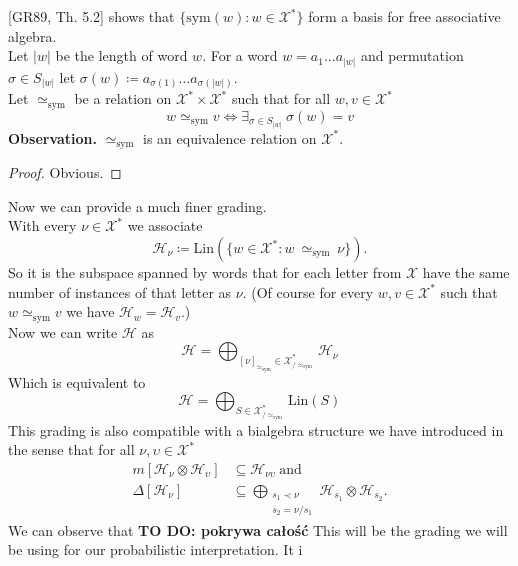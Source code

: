 \documentclass[a4paper, 12pt]{article}
\newcommand{\todo}[1]{\hfill \break \textbf{\Huge TO DO: #1 \hfill \break}\normalsize}
\newcommand{\SimeqSym}{{\simeq_\mathrm{sym}}}
\begin{document}
[GR89, Th. 5.2] shows that $\{\mathrm{sym}(w) : w \in \mathcal{X^*}\}$ form a basis for free associative
algebra. \\
Let $|w|$ be the length of word $w$. For a word $w = a_1\dots a_{|w|}$ and permutation
$\sigma \in S_{|w|}$ let $\sigma(w) \coloneqq a_{\sigma(1)}\dots a_{\sigma(|w|)}$. \\
Let $\simeq_\mathrm{sym}$ be
a relation on $\mathcal{X}^* \times \mathcal{X}^*$ such that for all $w, v \in \mathcal{X}^*$
\begin{equation*}
w \simeq_\mathrm{sym} v \iff \exists_{\sigma \in S_{|w|}}\ \sigma(w) = v
\end{equation*}
\textbf{Observation.} $\simeq_\mathrm{sym}$ is an equivalence relation on $\mathcal{X}^*$.
\begin{proof}
Obvious.
\end{proof}
\noindent Now we can provide a much finer grading. \\
With every $\nu \in \mathcal{X}^*$ we associate
\begin{equation}
\mathcal{H}_\nu \coloneqq \mathrm{Lin}(\{w \in \mathcal{X}^* : w\ \SimeqSym\ \nu\}).
\end{equation}
So it is the subspace spanned by words that for each letter from $\mathcal{X}$ have the same number of
instances of that letter as
$\nu$. (Of course for every $w, v \in \mathcal{X}^*$ such that $w \SimeqSym v$ we have
$\mathcal{H}_w = \mathcal{H}_v$.) \\
Now we can write $\mathcal{H}$ as
\begin{equation*}
\mathcal{H} = \bigoplus_{{[\nu]}_\SimeqSym \in \mathcal{X}^*_{/\SimeqSym}} \mathcal{H}_\nu
\end{equation*}
Which is equivalent to
\begin{equation*}
\mathcal{H} = \bigoplus_{S \in \mathcal{X}^*_{/\SimeqSym}} \mathrm{Lin}(S)
\end{equation*}
This grading is also compatible with a bialgebra structure we have introduced in the sense that for all
$\nu, \upsilon \in \mathcal{X}^*$
\begin{align*}
m[\mathcal{H}_\nu \otimes \mathcal{H}_\upsilon] &\subseteq \mathcal{H}_{\nu\upsilon} \mathrm{\ and} \\
\Delta[\mathcal{H}_\nu] &\subseteq \bigoplus_{\substack{s_1 \prec \nu \\ s_2 = \nu/ s_1}}
\mathcal{H}_{s_1} \otimes \mathcal{H}_{s_2}.
\end{align*}
We can observe that
\todo{pokrywa całość}
This will be the grading we will be using for our probabilistic interpretation. It i
\end{document}
